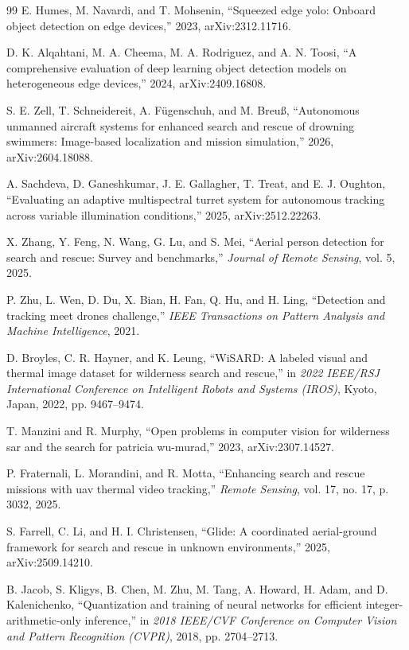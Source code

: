 \documentclass[conference]{IEEEtran}
\begin{document}
\begin{thebibliography}{99}
E. Humes, M. Navardi, and T. Mohsenin, ``Squeezed edge yolo: Onboard object
detection on edge devices,'' 2023, arXiv:2312.11716.

D. K. Alqahtani, M. A. Cheema, M. A. Rodriguez, and A. N. Toosi, ``A
comprehensive evaluation of deep learning object detection models on
heterogeneous edge devices,'' 2024, arXiv:2409.16808.

S. E. Zell, T. Schneidereit, A. F\"{u}genschuh, and M. Breu\ss{}, ``Autonomous
unmanned aircraft systems for enhanced search and rescue of drowning swimmers:
Image-based localization and mission simulation,'' 2026, arXiv:2604.18088.

A. Sachdeva, D. Ganeshkumar, J. E. Gallagher, T. Treat, and E. J. Oughton,
``Evaluating an adaptive multispectral turret system for autonomous tracking
across variable illumination conditions,'' 2025, arXiv:2512.22263.

X. Zhang, Y. Feng, N. Wang, G. Lu, and S. Mei, ``Aerial person detection for
search and rescue: Survey and benchmarks,'' \emph{Journal of Remote Sensing},
vol. 5, 2025.

P. Zhu, L. Wen, D. Du, X. Bian, H. Fan, Q. Hu, and H. Ling, ``Detection and
tracking meet drones challenge,'' \emph{IEEE Transactions on Pattern Analysis
and Machine Intelligence}, 2021.

D. Broyles, C. R. Hayner, and K. Leung, ``WiSARD: A labeled visual and thermal
image dataset for wilderness search and rescue,'' in \emph{2022 IEEE/RSJ
International Conference on Intelligent Robots and Systems (IROS)}, Kyoto,
Japan, 2022, pp. 9467--9474.

T. Manzini and R. Murphy, ``Open problems in computer vision for wilderness sar
and the search for patricia wu-murad,'' 2023, arXiv:2307.14527.

P. Fraternali, L. Morandini, and R. Motta, ``Enhancing search and rescue
missions with uav thermal video tracking,'' \emph{Remote Sensing}, vol. 17,
no. 17, p. 3032, 2025.

S. Farrell, C. Li, and H. I. Christensen, ``Glide: A coordinated aerial-ground
framework for search and rescue in unknown environments,'' 2025,
arXiv:2509.14210.

B. Jacob, S. Kligys, B. Chen, M. Zhu, M. Tang, A. Howard, H. Adam, and
D. Kalenichenko, ``Quantization and training of neural networks for efficient
integer-arithmetic-only inference,'' in \emph{2018 IEEE/CVF Conference on
Computer Vision and Pattern Recognition (CVPR)}, 2018, pp. 2704--2713.


\end{thebibliography}
\end{document}
